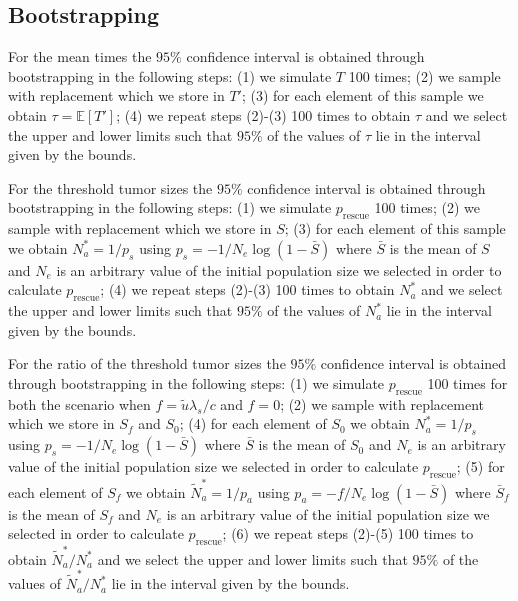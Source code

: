 \documentclass[12pt]{extarticle}
\newcommand{\presc}{p_\text{rescue}}
\begin{document}
\begin{appendices}
\section{Bootstrapping}
For the mean times the $95\%$ confidence interval is obtained through bootstrapping in the following steps: (1) we simulate $T$ 100 times; (2) we sample with replacement which we store in $T'$; (3) for each element of this sample we obtain $\tau=\mathbb{E}\left[T'\right]$; (4) we repeat steps (2)-(3) 100 times to obtain $\tau$ and we select the upper and lower limits such that $95\%$ of the values of $\tau$ lie in the interval given by the bounds.

For the threshold tumor sizes the $95\%$ confidence interval is obtained through bootstrapping in the following steps: (1) we simulate $\presc$ 100 times; (2) we sample with replacement which we store in $S$; (3) for each element of this sample we obtain $N_a^*=1/p_s$ using $p_s=-1/N_e\log\left(1-\bar{S}\right)$ where $\bar{S}$ is the mean of $S$ and $N_e$ is an arbitrary value of the initial population size we selected in order to calculate $\presc$; (4) we repeat steps (2)-(3) 100 times to obtain $N_a^*$ and we select the upper and lower limits such that $95\%$ of the values of $N_a^*$ lie in the interval given by the bounds.

For the ratio of the threshold tumor sizes the $95\%$ confidence interval is obtained through bootstrapping in the following steps: (1) we simulate $\presc$ 100 times for both the scenario when $f=\tilde{u}\lambda_s/c$ and $f=0$; (2) we sample with replacement which we store in $S_f$ and  $S_0$; (4) for each element of $S_0$ we obtain $N_a^*=1/p_s$ using $p_s=-1/N_e\log\left(1-\bar{S}\right)$ where $\bar{S}$ is the mean of $S_0$ and $N_e$ is an arbitrary value of the initial population size we selected in order to calculate $\presc$; (5) for each element of $S_f$ we obtain $\tilde{N}_a^*=1/p_a$ using $p_a=-f/N_e\log\left(1-\bar{S}\right)$ where $\bar{S}_f$ is the mean of $S_f$ and $N_e$ is an arbitrary value of the initial population size we selected in order to calculate $\presc$; (6) we repeat steps (2)-(5) 100 times to obtain $\tilde{N}_a^*/N_a^*$ and we select the upper and lower limits such that $95\%$ of the values of $\tilde{N}_a^*/N_a^*$ lie in the interval given by the bounds.

\end{appendices}
\end{document}
